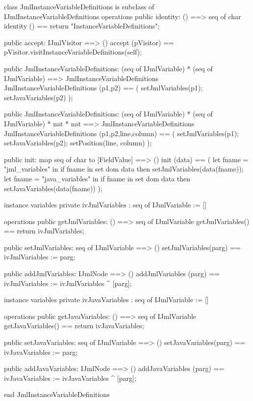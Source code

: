 \begin{vdm_al}
class JmlInstanceVariableDefinitions is subclass of IJmlInstanceVariableDefinitions
operations
  public identity: () ==> seq of char
  identity () == return "InstanceVariableDefinitions";

  public accept: IJmlVisitor ==> ()
  accept (pVisitor) == pVisitor.visitInstanceVariableDefinitions(self);

  public JmlInstanceVariableDefinitions:
    (seq of IJmlVariable) *
    (seq of IJmlVariable) ==> JmlInstanceVariableDefinitions
  JmlInstanceVariableDefinitions (p1,p2) == 
    ( setJmlVariables(p1);
      setJavaVariables(p2) );

  public JmlInstanceVariableDefinitions:
    (seq of IJmlVariable) *
    (seq of IJmlVariable) *
    nat *
    nat ==> JmlInstanceVariableDefinitions
  JmlInstanceVariableDefinitions (p1,p2,line,column) == 
    ( setJmlVariables(p1);
      setJavaVariables(p2);
      setPosition(line, column) );

  public init: map seq of char to [FieldValue] ==> ()
  init (data) ==
    ( let fname = "jml_variables" in
        if fname in set dom data
        then setJmlVariables(data(fname));
      let fname = "java_variables" in
        if fname in set dom data
        then setJavaVariables(data(fname)) );

instance variables
  private ivJmlVariables : seq of IJmlVariable := []

operations
  public getJmlVariables: () ==> seq of IJmlVariable
  getJmlVariables() == return ivJmlVariables;

  public setJmlVariables: seq of IJmlVariable ==> ()
  setJmlVariables(parg) == ivJmlVariables := parg;

  public addJmlVariables: IJmlNode ==> ()
  addJmlVariables (parg) == ivJmlVariables := ivJmlVariables ^ [parg];

instance variables
  private ivJavaVariables : seq of IJmlVariable := []

operations
  public getJavaVariables: () ==> seq of IJmlVariable
  getJavaVariables() == return ivJavaVariables;

  public setJavaVariables: seq of IJmlVariable ==> ()
  setJavaVariables(parg) == ivJavaVariables := parg;

  public addJavaVariables: IJmlNode ==> ()
  addJavaVariables (parg) == ivJavaVariables := ivJavaVariables ^ [parg];

end JmlInstanceVariableDefinitions
\end{vdm_al}

